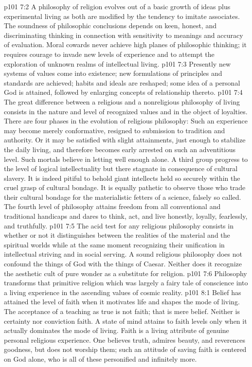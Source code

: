 \vs p101 7:2 A philosophy of religion evolves out of a basic growth of ideas plus experimental living as both are modified by the tendency to imitate associates. The soundness of philosophic conclusions depends on keen, honest, and discriminating thinking in connection with sensitivity to meanings and accuracy of evaluation. Moral cowards never achieve high planes of philosophic thinking; it requires courage to invade new levels of experience and to attempt the exploration of unknown realms of intellectual living.
\vs p101 7:3 Presently new systems of values come into existence; new formulations of principles and standards are achieved; habits and ideals are reshaped; some idea of a personal God is attained, followed by enlarging concepts of relationship thereto.
\pc \vs p101 7:4 The great difference between a religious and a nonreligious philosophy of living consists in the nature and level of recognized values and in the object of loyalties. There are four phases in the evolution of religious philosophy: Such an experience may become merely conformative, resigned to submission to tradition and authority. Or it may be satisfied with slight attainments, just enough to stabilize the daily living, and therefore becomes early arrested on such an adventitious level. Such mortals believe in letting well enough alone. A third group progress to the level of logical intellectuality but there stagnate in consequence of cultural slavery. It is indeed pitiful to behold giant intellects held so securely within the cruel grasp of cultural bondage. It is equally pathetic to observe those who trade their cultural bondage for the materialistic fetters of a science, falsely so called. The fourth level of philosophy attains freedom from all conventional and traditional handicaps and dares to think, act, and live honestly, loyally, fearlessly, and truthfully.
\vs p101 7:5 The acid test for any religious philosophy consists in whether or not it distinguishes between the realities of the material and the spiritual worlds while at the same moment recognizing their unification in intellectual striving and in social serving. A sound religious philosophy does not confound the things of God with the things of Caesar. Neither does it recognize the aesthetic cult of pure wonder as a substitute for religion.
\vs p101 7:6 Philosophy transforms that primitive religion which was largely a fairy tale of conscience into a living experience in the ascending values of cosmic reality.
\vs p101 8:1 Belief has attained the level of faith when it motivates life and shapes the mode of living. The acceptance of a teaching as true is not faith; that is mere belief. Neither is certainty nor conviction faith. A state of mind attains to faith levels only when it actually dominates the mode of living. Faith is a living attribute of genuine personal religious experience. One believes truth, admires beauty, and reverences goodness, but does not worship them; such an attitude of saving faith is centered on God alone, who is all of these personified and infinitely more.
